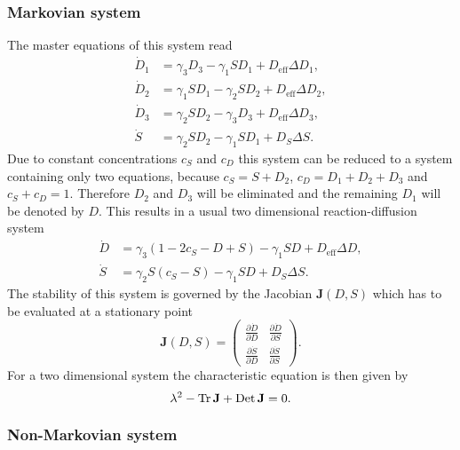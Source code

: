 \subsubsection{Markovian system}

The master equations of this system read
%
\begin{align}
\nonumber \dot{D}_1 &= \gamma_3 D_3-\gamma_1 S D_1 + D_{\text{eff}}\Delta D_1,\\
\nonumber \dot{D}_2 &= \gamma_1 S D_1-\gamma_2 S D_2 + D_{\text{eff}}\Delta D_2,\\
\nonumber \dot{D}_3 &= \gamma_2 S D_2-\gamma_3 D_3 + D_{\text{eff}}\Delta D_3,\\
\label{eq:4dseq} \dot{S} &= \gamma_2 S D_2-\gamma_1 S D_1 + D_S\Delta S.
\end{align}
%
Due to constant concentrations $c_S$ and $c_D$ this system can be reduced to a system containing only two equations, because $c_S=S+D_2$, $c_D=D_1+D_2+D_3$ and $c_S+c_D=1$.
Therefore $D_2$ and $D_3$ will be eliminated and the remaining $D_1$ will be denoted by $D$.
This results in a usual two dimensional reaction-diffusion system
%
\begin{align}
\nonumber \dot{D} &= \gamma_3\left(1-2c_S-D+S\right)-\gamma_1 S D + D_{\text{eff}} \Delta D,\\
\label{eq:2dseq} \dot{S} &= \gamma_2 S \left(c_S-S\right)-\gamma_1 S D + D_S \Delta S. 
\end{align}
%
The stability of this system is governed by the Jacobian $\mathbf{J}(D,S)$ which has to be evaluated at a stationary point
%
\begin{equation}
	\mathbf{J}(D,S) = \begin{pmatrix}
	                  	\frac{\partial \dot{D}}{\partial D} & \frac{\partial \dot{D}}{\partial S} \\
						\frac{\partial \dot{S}}{\partial D} & \frac{\partial \dot{S}}{\partial S} 
	                  \end{pmatrix}.
\label{eq:Jacob_sheepndog}
\end{equation}
%
For a two dimensional system the characteristic equation is then given by
%
\begin{equation}
	\lambda^2-\operatorname{Tr}\mathbf{J}+\operatorname{Det}\mathbf{J} = 0.
\end{equation}

\subsubsection{Non-Markovian system}

